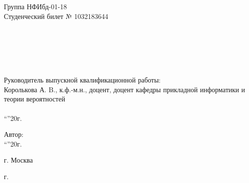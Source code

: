 \begin{titlepage}
  \begin{minipage}{.45\textwidth}
    Группа НФИбд-01-18\\
    Студенческий билет № 1032183644 \\ \\ \\ \\ \\ \\
  \end{minipage}%
  \hfill
  \begin{minipage}{.5\textwidth}
    Руководитель выпускной
    квалификационной работы: \\ [2mm]
    Королькова А. B., к.ф.-м.н., доцент, доцент кафедры прикладной
    информатики и теории вероятностей\\[2mm]
    \underline{\hspace{3cm}} \\
    ``\underline{\hspace{1cm}}''\underline{\hspace{3cm}}20\underline{\hspace{1cm}}г.
\end{minipage}%

\vfill

\hfill
\begin{minipage}{.5\textwidth}
  Автор: \underline{\hspace{3cm}} \\
  ``\underline{\hspace{1cm}}''\underline{\hspace{3cm}}20\underline{\hspace{1cm}}г.
\end{minipage}%


\vfill

\centering
г. Москва

 г.
\end{titlepage}
